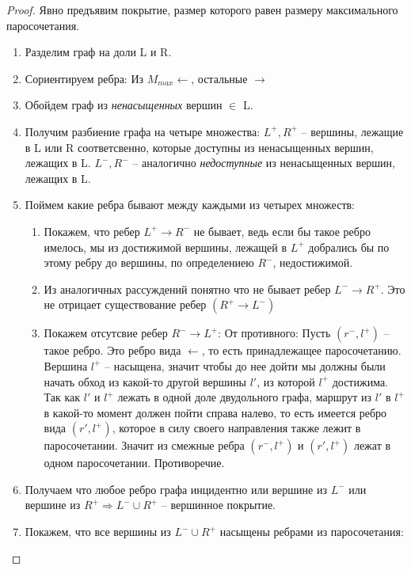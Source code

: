 \begin{proof} 
	Явно предъявим покрытие, размер которого равен размеру максимального паросочетания.
	\begin{enumerate}
		\item Разделим граф на доли L и R.
		\item Сориентируем ребра: Из $M_{max} \longleftarrow$, остальные $\longrightarrow$
		\item Обойдем граф из \textit{ненасыщенных} вершин $\in$ L.
		\item Получим разбиение графа на четыре множества: 
		$L^+, R^+$ -- вершины, лежащие в L или R соответсвенно, которые доступны из ненасыщенных вершин, лежащих в L. 
		$L^-, R ^-$ -- аналогично \textit{недоступные} из ненасыщенных вершин, лежащих в L. 
		\item Поймем какие ребра бывают между каждыми из четырех множеств:
		\begin{enumerate}
			\item Покажем, что ребер $L^+ \rightarrow R^-$ не бывает, ведь если бы такое ребро имелось, мы из достижимой вершины, лежащей в $L^+$ добрались бы по этому ребру до вершины, по определениею $R^-$, недостижимой. 
			\item Из аналогичных рассуждений понятно что не бывает ребер $L^- \rightarrow R^+$. Это не отрицает существование ребер $(R^+ \rightarrow L^-)$
			\item Покажем отсутсвие ребер $R^- \rightarrow L^+$:
		От противного: Пусть  $(r^-, l^+)$ -- такое ребро. Это ребро вида  $\longleftarrow$, то есть принадлежащее паросочетанию.\\
		Вершина $l^+$ -- насыщена, значит чтобы до нее дойти мы должны были начать обход из какой-то другой вершины  $l'$, из которой $l^+$ достижима.\\
		Так как  $l'$ и $l^+$ лежать в одной доле двудольного графа, маршрут из $l'$ в $l^+$ в какой-то момент должен пойти справа налево, то есть имеется ребро вида $(r', l^+)$, которое в силу своего направления также лежит в паросочетании. Значит из смежные ребра  $(r^-, l^+)$ и  $(r', l^+)$ лежат в одном паросочетании. Противоречие.\\
		\end{enumerate}
		\item Получаем что любое ребро графа инцидентно или вершине из $L^-$ или вершине из $R^+ \Rightarrow L^- \cup R^+$ -- вершинное покрытие.
		\item Покажем, что все вершины из $L^- \cup R^+$ насыщены ребрами из паросочетания:\\

\end{enumerate}
\end{proof}
